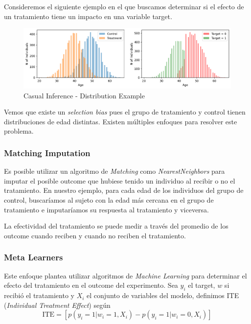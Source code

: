 Consideremos el siguiente ejemplo en el que buscamos determinar si el efecto de un tratamiento tiene un impacto en una variable target. 

\begin{figure}[H]
    \center
    \includegraphics[scale=0.5]{notebooks/STATS/img/causal_inference_age_distribution.png}
    \caption{Casual Inference - Distribution Example}
\end{figure}

Vemos que existe un \textit{selection bias} pues el grupo de tratamiento y control tienen distribuciones de edad distintas. Existen múltiples enfoques para resolver este problema. 

\subsubsection{Matching Imputation}

Es posible utilizar un algoritmo de \textit{Matching} como \textit{NearestNeighbors} para imputar el posible outcome que hubiese tenido un individuo al recibir o no el tratamiento. En nuestro ejemplo, para cada edad de los individuos del grupo de control, buscaríamos al sujeto con la edad más cercana en el grupo de tratamiento e imputaríamos su respuesta al tratamiento y viceversa. 

La efectividad del tratamiento se puede medir a través del promedio de los outcome cuando reciben y cuando no reciben el tratamiento. 

\subsubsection{Meta Learners}

Este enfoque plantea utilizar algoritmos de \textit{Machine Learning} para determinar el efecto del tratamiento en el outcome del experimento. Sea $y_i$ el target, $w$ si recibió el tratamiento y $X_i$ el conjunto de variables del modelo, definimos ITE (\textit{Individual Treatment Effect}) según 
$$
\text{ITE} = \left [ p(y_i = 1 | w_i = 1, X_i) - p(y_i = 1 | w_i = 0, X_i) \right ]
$$

